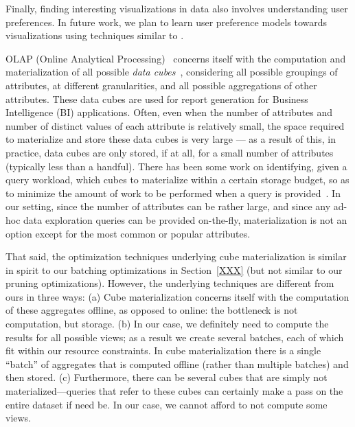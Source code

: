 Finally, finding interesting visualizations in data also involves understanding
user preferences. 
In future work, we plan to learn user preference models towards visualizations
using techniques similar to \cite{CHI:YangLZ14, IUIGotzW09}. 



OLAP (Online Analytical Processing)~\cite{olap} 
concerns itself with the 
computation and materialization of all possible 
{\em data cubes}~\cite{DBLP:jounral/DMKD/GrayCBLR97},
considering all possible groupings of attributes,
at different granularities, and all possible aggregations of other attributes.
These data cubes are used for report generation for Business Intelligence
(BI) applications.
Often, even when the number of attributes and number
of distinct values of each attribute is relatively small,
the space required to materialize and store these data cubes is
very large --- as a result of this, in practice, data cubes
are only stored, if at all, for a small number of attributes 
(typically less than a handful).
There has been some work on identifying, given a query workload,
which cubes to materialize within a certain storage budget,
so as to minimize the amount of work to be performed when a
query is provided~\cite{DBLP:conf/VLDB/AgarwalADG96,DBLP:conf/SIGMOD/HarinarayanRU96}.
In our setting, since the number of attributes can be rather large,
and since any ad-hoc data exploration queries can be provided on-the-fly, materialization
is not an option except for the most common or popular attributes.

That said, the optimization techniques underlying cube materialization 
is similar in spirit to our batching optimizations in Section~\ref{XXX}
(but not similar to our pruning optimizations).
However, the underlying techniques are different from ours in three ways:
(a) Cube materialization concerns itself with the computation
of these aggregates offline, as opposed to online: the bottleneck
is not computation, but storage.
(b) In our case, we definitely need to compute the results for
all possible views; as a result we create several batches,
each of which fit within our resource constraints. 
In cube materialization there is a single ``batch'' of aggregates
that is computed offline (rather than multiple batches) and then stored.
(c) Furthermore, there can be several cubes that are simply not materialized---queries
that refer to these cubes can certainly make a pass on the entire dataset if need be.
In our case, we cannot afford to not compute some views.



